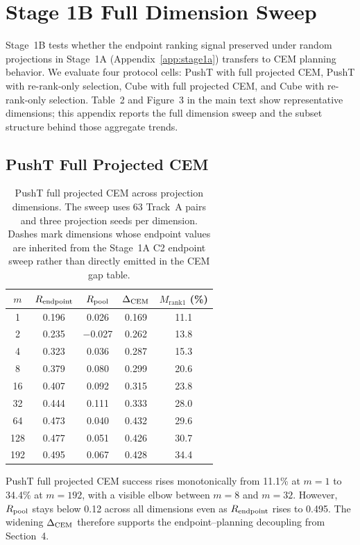 \section{Stage 1B Full Dimension Sweep}
\label{app:stage1b}

Stage~1B tests whether the endpoint ranking signal preserved under random
projections in Stage~1A (Appendix~\ref{app:stage1a}) transfers to CEM
planning behavior.  We evaluate four protocol cells: PushT with full
projected CEM, PushT with re-rank-only selection, Cube with full projected
CEM, and Cube with re-rank-only selection.  Table~2 and Figure~3 in the
main text show representative dimensions; this appendix reports the full
dimension sweep and the subset structure behind those aggregate trends.

\subsection{PushT Full Projected CEM}
\label{app:stage1b_pusht_full}

\begin{table}[h]
\centering
\caption{PushT full projected CEM across projection dimensions.  The sweep
uses 63 Track~A pairs and three projection seeds per dimension.  Dashes mark
dimensions whose endpoint values are inherited from the Stage~1A C2 endpoint
sweep rather than directly emitted in the CEM gap table.}
\label{tab:g-pusht-full}
\small
\begin{tabular}{ccccc}
\toprule
$m$ & $R_\text{endpoint}$ & $R_\text{pool}$ & $\Delta_\text{CEM}$ & $M_{\text{rank1}}$ (\%) \\
\midrule
1 & 0.196 & 0.026 & 0.169 & 11.1 \\
2 & 0.235 & $-$0.027 & 0.262 & 13.8 \\
4 & 0.323 & 0.036 & 0.287 & 15.3 \\
8 & 0.379 & 0.080 & 0.299 & 20.6 \\
16 & 0.407 & 0.092 & 0.315 & 23.8 \\
32 & 0.444 & 0.111 & 0.333 & 28.0 \\
64 & 0.473 & 0.040 & 0.432 & 29.6 \\
128 & 0.477 & 0.051 & 0.426 & 30.7 \\
192 & 0.495 & 0.067 & 0.428 & 34.4 \\
\bottomrule
\end{tabular}
\end{table}

PushT full projected CEM success rises monotonically from 11.1\% at $m=1$
to 34.4\% at $m=192$, with a visible elbow between $m=8$ and $m=32$.
However, $R_\text{pool}$ stays below 0.12 across all dimensions even as
$R_\text{endpoint}$ rises to 0.495.  The widening $\Delta_\text{CEM}$ therefore supports
the endpoint--planning decoupling from Section~4.

